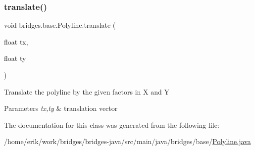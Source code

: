 \mbox{\label{classbridges_1_1base_1_1_polyline_a8c0589441852bb08f223004d948818f1}} 
\subsubsection{\texorpdfstring{translate()}{translate()}}
{\footnotesize\ttfamily void bridges.\+base.\+Polyline.\+translate (\begin{DoxyParamCaption}\item[{float}]{tx,  }\item[{float}]{ty }\end{DoxyParamCaption})}

Translate the polyline by the given factors in X and Y


\begin{DoxyParams}{Parameters}
{\em tx,ty} & translation vector \\
\hline
\end{DoxyParams}


The documentation for this class was generated from the following file\+:\begin{DoxyCompactItemize}
\item 
/home/erik/work/bridges/bridges-\/java/src/main/java/bridges/base/\hyperlink{_polyline_8java}{Polyline.\+java}\end{DoxyCompactItemize}
